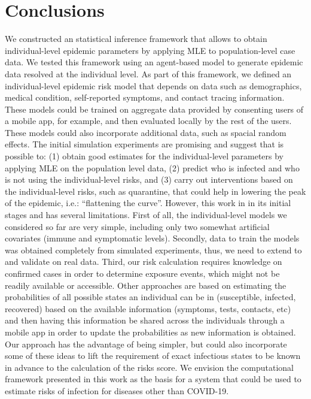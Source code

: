 \documentclass{article}
\begin{document}
\section{Conclusions}

We constructed an statistical inference framework that allows to obtain individual-level epidemic parameters by applying MLE to population-level case data. We tested this framework using an agent-based model to generate epidemic data resolved at the individual level. As part of this framework, we defined an individual-level epidemic risk model that depends on data such as demographics, medical condition, self-reported symptoms, and contact tracing information. These models could be trained on aggregate data provided by consenting users of a mobile app, for example, and then evaluated locally by the rest of the users. These models could also incorporate additional data, such as spacial random effects. The initial simulation experiments are promising and suggest that is possible to: (1) obtain good estimates for the individual-level parameters by applying MLE on the population level data, (2)  predict who is infected and who is not using the individual-level risks, and (3) carry out interventions based on the individual-level risks, such as quarantine, that could help in lowering the peak of the epidemic, i.e.: “flattening the curve”. However, this work in in its initial stages and has several limitations. First of all, the individual-level models we considered so far are very simple, including only two somewhat artificial covariates (immune and symptomatic levels). Secondly, data to train the models was obtained completely from simulated experiments, thus, we need to extend to and validate on real data. Third, our risk calculation requires knowledge on confirmed cases in order to determine exposure events, which might not be readily available or accessible. Other approaches \cite{sphinxteam, Alsdurf2020} are based on estimating the probabilities of all possible states an individual can be in (susceptible, infected, recovered) based on the available information (symptoms, tests, contacts, etc) and then having this information be shared across the individuals through a mobile app in order to update the probabilities as new information is obtained. Our approach has the advantage of being simpler, but could also incorporate some of these ideas to lift the requirement of exact infectious states to be known in advance to the calculation of the risks score. We envision the computational framework presented in this work as the basis for a system that could be used to estimate risks of infection for diseases other than COVID-19.

% 
% 
\printbibliography
\end{document}
